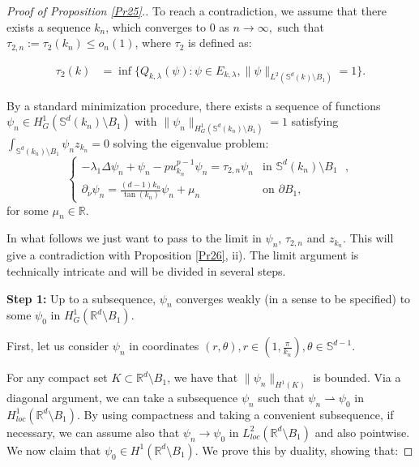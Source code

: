 \documentclass[reqno]{amsart}
\def\R{\mathbb R}
\numberwithin{equation}{section}
\newenvironment{key words}{\textbf{Keywords}\mbox{  }}{ }
\begin{document}
\begin{proof}[Proof of Proposition \ref{Pr25}.]
\medskip To reach a contradiction, we assume that there exists a sequence ${k_{n}}$, which converges to $0$ as $n\rightarrow\infty,$ such that $\tau_{2,n}:=\tau_{2}(k_{n})\leq o_n(1)$, where $\tau_{2}$ is defined as:

\begin{align*}
	\tau_2(k)&=\inf\{Q_{k, \lambda}(\psi):\psi\in E_{k, \lambda},\|\psi\|_{L^{2}(\mathbb{S}^{d}(k)\setminus B_{1})}=1\}.  \end{align*}
	
 By a standard minimization procedure, there exists a sequence of functions $\psi_{n}\in H^{1}_{G}(\mathbb{S}^{d}(k_{n})\setminus B_{1})$ with $\|\psi_{n}\|_{H^{1}_{G}(\mathbb{S}^{d}(k_{n})\setminus B_{1})}=1$ satisfying $\int_{\mathbb{S}^{d}(k_{n})\setminus B_{1}}\psi_{n} z_{k_{n}}=0$ solving the eigenvalue problem:
\begin{equation}\label{eq000}
  \begin{cases}
     -\lambda_{1}\Delta\psi_{n}+\psi_{n}-pu_{k_{n}} ^{p-1}\psi_{n}= \tau_{2,n}\psi_{n}&\mbox{in $\mathbb{S}^{d}(k_{n})\setminus B_{1}$ },\\
      \partial_{\nu}\psi_{n}=\frac{(d-1)k_{n}}{\tan(k_{n})}\psi_{n}+\mu_n &\mbox{on $\partial B_1$},
      \end{cases}
\end{equation}
for some $\mu_n\in \R.$

In what follows we just want to pass to the limit in $\psi_n$, $\tau_{2,n}$ and $z_{k_n}$. This will give a contradiction with Proposition \ref{Pr26}, ii). The limit argument is technically intricate and will be divided in several steps.

\medskip

\textbf{Step 1:} Up to a subsequence, $\psi_{n}$ converges weakly (in a sense to be specified) to some $\psi_{0}$ in $H^{1}_{G}(\mathbb{R}^{d}\setminus B_{1})$.

\medskip

First, let us consider $\psi_{n}$ in coordinates $(r,\theta), r\in (1,\frac{\pi}{k_n}),\theta\in\mathbb{S}^{d-1}.$

For any compact set  $K \subset \R^{d} \setminus B_1$, we have that $\| \psi_n \|_{H^1(K)}$ is bounded. Via a diagonal argument, we can take a subsequence $\psi_n$ such that $\psi_n \rightharpoonup \psi_0$ in $H^1_{loc}(\R^d \setminus B_1)$. By using compactness and taking a convenient subsequence, if necessary, we can
assume also that $\psi_n \to \psi_0$ in $L^2_{loc}(\R^d \setminus B_1)$ and also pointwise. We now claim that $\psi_0 \in H^1(\R^d \setminus B_1)$. We prove this by duality, showing that:


\end{proof}
\end{document}
